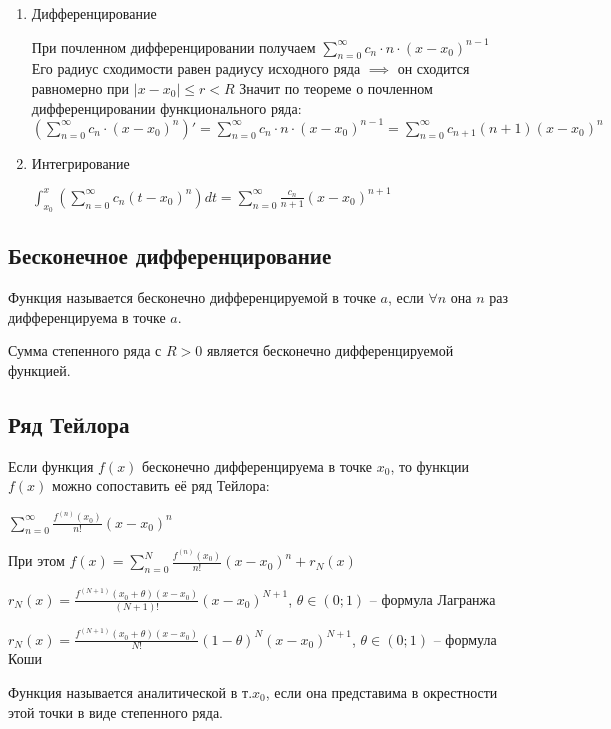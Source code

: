 \begin{enumerate}
      \item Дифференцирование
      
      При почленном дифференцировании получаем $\sum_{n=0}^{\infty} c_n \cdot n \cdot (x - x_0)^{n - 1}$
      Его радиус сходимости равен радиусу исходного ряда $\implies$ он сходится равномерно при $|x - x_0| \leq r < R$
      Значит по теореме о почленном дифференцировании функционального ряда:
      $\left(\sum_{n=0}^{\infty}c_n\cdot (x - x_0)^n\right)' = \sum_{n=0}^{\infty} c_n \cdot n \cdot (x - x_0)^{n - 1} = \sum_{n=0}^{\infty} c_{n+1}(n+1)(x - x_0)^n$
      \item Интегрирование
      
      $\int_{x_0}^{x}\left(\sum_{n=0}^{\infty}c_n(t - x_0)^n\right) dt = \sum_{n=0}^{\infty} \frac{c_n}{n+1} (x - x_0)^{n + 1}$
\end{enumerate}

\subsection{Бесконечное дифференцирование}

Функция называется бесконечно дифференцируемой в точке $a$, если $\forall n$ она $n$ раз дифференцируема в точке $a$.

Сумма степенного ряда с $R > 0$ является бесконечно дифференцируемой функцией.

\subsection{Ряд Тейлора}

Если функция $f(x)$ бесконечно дифференцируема в точке $x_0$, то функции $f(x)$ можно сопоставить её ряд Тейлора:

$\sum_{n=0}^{\infty} \frac{f^{(n)}(x_0)}{n!}(x - x_0)^n$

При этом $f(x) = \sum_{n=0}^{N} \frac{f^{(n)}(x_0)}{n!}(x - x_0)^n + r_N(x)$

$r_N(x) = \frac{f^{(N+1)}(x_0+\theta)(x - x_0)}{(N+1)!}(x - x_0)^{N+1}$, $\theta \in (0; 1)$ -- формула Лагранжа

$r_N(x) = \frac{f^{(N+1)}(x_0+\theta)(x - x_0)}{N!}(1-\theta)^N(x - x_0)^{N+1}$, $\theta \in (0; 1)$ -- формула Коши

\begin{definition}
Функция называется аналитической в т.$x_0$, если она представима в окрестности этой точки в виде степенного ряда.
\end{definition}

